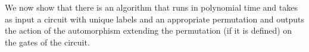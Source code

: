 \documentclass[../paper.tex]{subfiles}
\begin{document}
We now show that there is an algorithm that runs in polynomial time and takes as
input a circuit with unique labels and an appropriate permutation and outputs
the action of the automorphism extending the permutation (if it is defined) on
the gates of the circuit.


  

\end{document}
